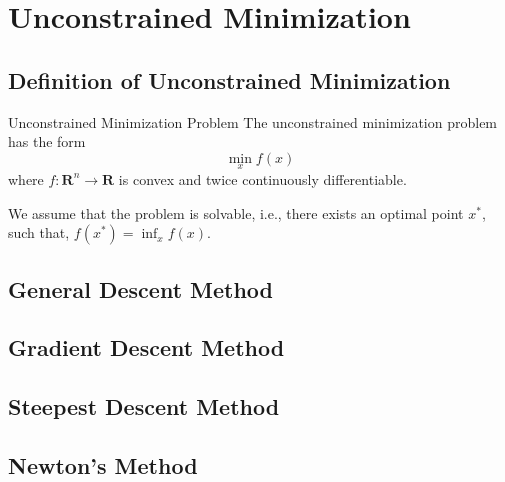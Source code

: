 \chapter{Unconstrained Minimization}

\section{Definition of Unconstrained Minimization}

\begin{definition}{Unconstrained Minimization Problem}{}
    The unconstrained minimization problem has the form
    \begin{equation}
        \min_x f(x)
    \end{equation}
    where $f:\mathbf{R}^n\rightarrow\mathbf{R}$ is convex and twice continuously differentiable.
\end{definition}

\begin{note}
    We assume that the problem is solvable, i.e., there exists an optimal point $x^*$, such that, $f(x^*)=\inf_x f(x)$.
\end{note}

\begin{example}

\end{example}

\begin{example}

\end{example}

\begin{example}

\end{example}

\begin{example}

\end{example}

\section{General Descent Method}

\section{Gradient Descent Method}

\section{Steepest Descent Method}

\section{Newton's Method}